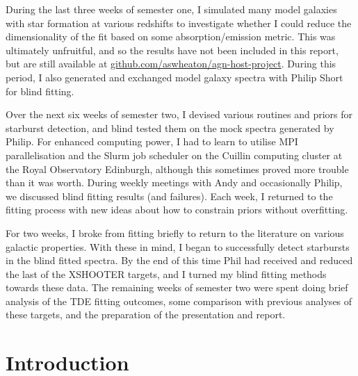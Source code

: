 \documentclass[a4paper,12pt]{article}
\begin{document}
During the last three weeks of semester one, I simulated many model galaxies
with star formation at various redshifts to investigate whether I could reduce
the dimensionality of the fit based on some absorption/emission metric. This
was ultimately unfruitful, and so the results have not been included in this
report, but are still available at \url{github.com/aswheaton/agn-host-project}.
During this period, I also generated and exchanged model galaxy spectra with
Philip Short for blind fitting.

Over the next six weeks of semester two, I devised various routines and priors
for starburst detection, and blind tested them on the mock spectra generated by
Philip. For enhanced computing power, I had to learn to utilise MPI
parallelisation and the Slurm job scheduler on the Cuillin computing cluster at
the Royal Observatory Edinburgh, although this sometimes proved more trouble
than it was worth. During weekly meetings with Andy and occasionally Philip, we
discussed blind fitting results (and failures). Each week, I returned to the
fitting process with new ideas about how to constrain priors without
overfitting.

For two weeks, I broke from fitting briefly to return to the literature on
various galactic properties. With these in mind, I began to successfully detect
starbursts in the blind fitted spectra. By the end of this time Phil had
received and reduced the last of the XSHOOTER targets, and I turned my blind
fitting methods towards these data. The remaining weeks of semester two were
spent doing brief analysis of the TDE fitting outcomes, some comparison with
previous analyses of these targets, and the preparation of the presentation and
report.

\newpage
\thispagestyle{empty}
\tableofcontents

\newpage
\setcounter{page}{1} %
\section{Introduction}\label{sec:introduction}
\end{document}
